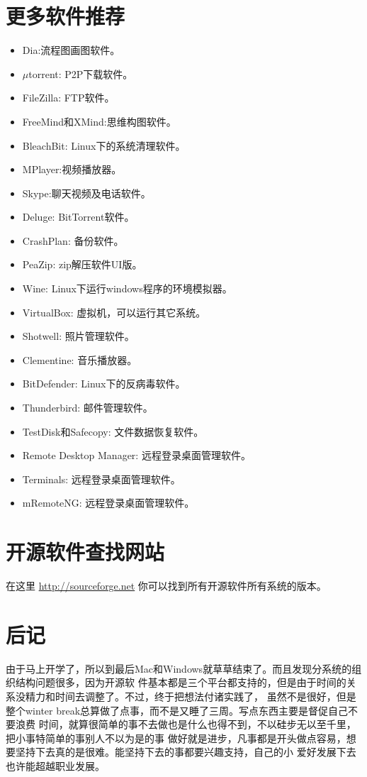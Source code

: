 \documentclass[11pt,fleqn]{book} %
\begin{document}
\section{更多软件推荐}
\begin{itemize}
  \item Dia:流程图画图软件。
  \item $\mu$torrent: P2P下载软件。
  \item FileZilla: FTP软件。
  \item FreeMind和XMind:思维构图软件。
  \item BleachBit: Linux下的系统清理软件。
  \item MPlayer:视频播放器。 
  \item Skype:聊天视频及电话软件。
  \item Deluge: BitTorrent软件。
  \item CrashPlan: 备份软件。
  \item PeaZip: zip解压软件UI版。
  \item Wine: Linux下运行windows程序的环境模拟器。
  \item VirtualBox: 虚拟机，可以运行其它系统。
  \item Shotwell: 照片管理软件。
  \item Clementine: 音乐播放器。
  \item BitDefender: Linux下的反病毒软件。
  \item Thunderbird: 邮件管理软件。
  \item TestDisk和Safecopy: 文件数据恢复软件。
  \item Remote Desktop Manager: 远程登录桌面管理软件。
  \item Terminals: 远程登录桌面管理软件。
  \item mRemoteNG: 远程登录桌面管理软件。
\end{itemize}
\section{开源软件查找网站}
在这里 \textcolor{blue}{\url{http://sourceforge.net}} 你可以找到所有开源软件所有系统的版本。
\section{后记}
由于马上开学了，所以到最后Mac和Windows就草草结束了。而且发现分系统的组织结构问题很多，因为开源软
件基本都是三个平台都支持的，但是由于时间的关系没精力和时间去调整了。不过，终于把想法付诸实践了，
虽然不是很好，但是整个winter break总算做了点事，而不是又睡了三周。写点东西主要是督促自己不要浪费
时间，就算很简单的事不去做也是什么也得不到，不以硅步无以至千里，把小事特简单的事别人不以为是的事
做好就是进步，凡事都是开头做点容易，想要坚持下去真的是很难。能坚持下去的事都要兴趣支持，自己的小
爱好发展下去也许能超越职业发展。
\end{document}
